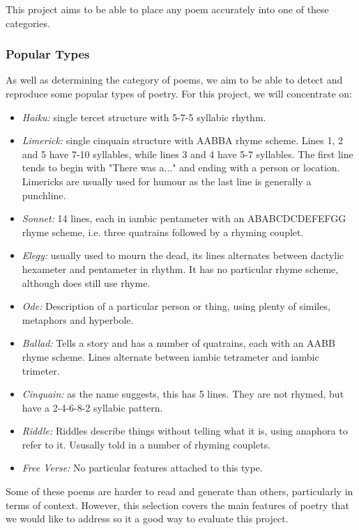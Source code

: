 This project aims to be able to place any poem accurately into one of these categories.

\subsubsection{Popular Types}
As well as determining the category of poems, we aim to be able to detect and reproduce some popular types of poetry. For this project, we will concentrate on:
\begin{itemize}
\item{\textit{Haiku:} single tercet structure with 5-7-5 syllabic rhythm.}
\item{\textit{Limerick:} single cinquain structure with AABBA rhyme scheme. Lines 1, 2 and 5 have 7-10 syllables, while lines 3 and 4 have 5-7 syllables. The first line tends to begin with "There was a..." and ending with a person or location. Limericks are usually used for humour as the last line is generally a punchline.}
\item{\textit{Sonnet:} 14 lines, each in iambic pentameter with an ABABCDCDEFEFGG rhyme scheme, i.e. three quatrains followed by a rhyming couplet.}
\item{\textit{Elegy:} usually used to mourn the dead, its lines alternates between dactylic hexameter and pentameter in rhythm. It has no particular rhyme scheme, although does still use rhyme. }
\item{\textit{Ode:} Description of a particular person or thing, using plenty of similes, metaphors and hyperbole.}
\item{\textit{Ballad:} Tells a story and has a number of quatrains, each with an AABB rhyme scheme. Lines alternate between iambic tetrameter and iambic trimeter.}
\item{\textit{Cinquain:} as the name suggests, this has 5 lines. They are not rhymed, but have a 2-4-6-8-2 syllabic pattern. }
\item{\textit{Riddle:} Riddles describe things without telling what it is, using anaphora to refer to it. Ususally told in a number of rhyming couplets.}
\item{\textit{Free Verse:} No particular features attached to this type.}
\end{itemize} 

Some of these poems are harder to read and generate than others, particularly in terms of context. However, this selection covers the main features of poetry that we would like to address so it a good way to evaluate this project.


